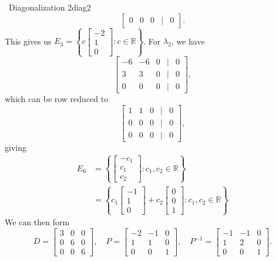 \begin{example}{\Difficulty\,\Difficulty\,\,Diagonalization 2}{diag2}
\begin{equation*}
\begin{bmatrix}
                    0 & 0 & 0 & | & 0 
                \end{bmatrix}.
            \end{equation*}
            This gives us \(E_3=\left\{c\begin{bmatrix} -2 \\ 1 \\ 0 \end{bmatrix}:c\in\mathbb{R}\right\}\). For \(\lambda_2\), we have
            \begin{equation*}
                \begin{bmatrix}
                    -6 & -6 & 0 & | & 0 \\
                    3 & 3 & 0 & | & 0 \\
                    0 & 0 & 0 & | & 0
                \end{bmatrix},
            \end{equation*}
            which can be row reduced to
            \begin{equation*}
                \begin{bmatrix}
                    1 & 1 & 0 & | & 0 \\
                    0 & 0 & 0 & | & 0 \\
                    0 & 0 & 0 & | & 0
                \end{bmatrix},
            \end{equation*}
            giving
            \begin{align*}
                E_6&=\left\{\begin{bmatrix} -c_1 \\ c_1 \\ c_2 \end{bmatrix}:c_1,c_2\in\mathbb{R}\right\} \\ 
                &=\left\{c_1\begin{bmatrix} -1 \\ 1 \\ 0 \end{bmatrix}+c_2\begin{bmatrix} 0 \\ 0 \\ 1 \end{bmatrix}:c_1,c_2\in\mathbb{R}\right\}
            \end{align*}   
            We can then form
            \begin{equation*}
                D=\begin{bmatrix} 3 & 0 & 0 \\ 0 & 6 & 0 \\ 0 & 0 & 6 \end{bmatrix},\quad P=\begin{bmatrix} -2 & -1 & 0 \\ 1 & 1 & 0 \\ 0 & 0 & 1 \end{bmatrix},\quad P^{-1}=\begin{bmatrix} -1 & -1 & 0 \\ 1 & 2 & 0 \\ 0 & 0 & 1 \end{bmatrix}.

\end{equation*}
\end{example}

